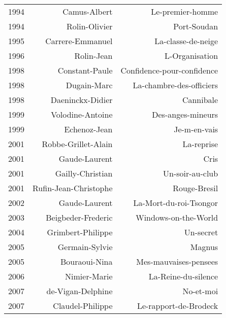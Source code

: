 \begin{xltabular}{\textwidth}{lrr}
1994 &                         Camus-Albert &                      Le-premier-homme \\
1994 &                        Rolin-Olivier &                           Port-Soudan \\
1995 &                     Carrere-Emmanuel &                    La-classe-de-neige \\
1996 &                           Rolin-Jean &                        L-Organisation \\
1998 &                       Constant-Paule &            Confidence-pour-confidence \\
1998 &                          Dugain-Marc &              La-chambre-des-officiers \\
1998 &                     Daeninckx-Didier &                             Cannibale \\
1999 &                     Volodine-Antoine &                     Des-anges-mineurs \\
1999 &                         Echenoz-Jean &                          Je-m-en-vais \\
2001 &                  Robbe-Grillet-Alain &                            La-reprise \\
2001 &                        Gaude-Laurent &                                  Cris \\
2001 &                     Gailly-Christian &                       Un-soir-au-club \\
2001 &                Rufin-Jean-Christophe &                          Rouge-Bresil \\
2002 &                        Gaude-Laurent &                La-Mort-du-roi-Tsongor \\
2003 &                   Beigbeder-Frederic &                  Windows-on-the-World \\
2004 &                    Grimbert-Philippe &                             Un-secret \\
2005 &                       Germain-Sylvie &                                Magnus \\
2005 &                        Bouraoui-Nina &                 Mes-mauvaises-pensees \\
2006 &                         Nimier-Marie &                   La-Reine-du-silence \\
2007 &                    de-Vigan-Delphine &                             No-et-moi \\
2007 &                     Claudel-Philippe &                 Le-rapport-de-Brodeck \\

\end{xltabular}
